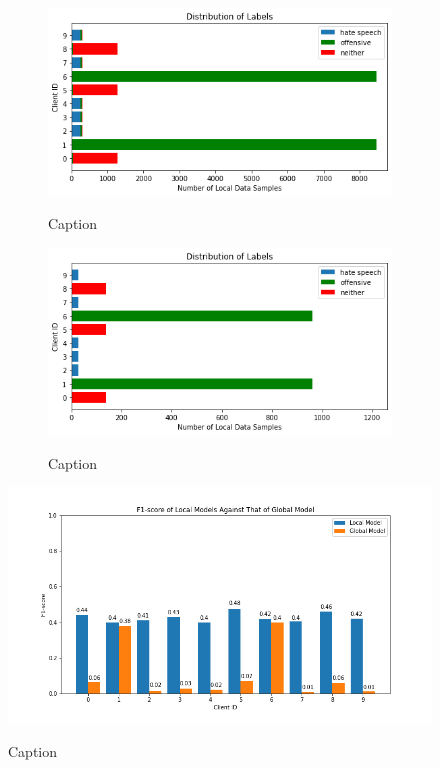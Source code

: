 \documentclass[letterpaper]{article} %
\begin{document}
\begin{figure}[hbt!]

\begin{subfigure}{\columnwidth}
{\includegraphics[width=\columnwidth]{noniid-quantity-based-label-imbalance-1_distribution_of_labels_5}}
\caption{Caption}
\end{subfigure}

\begin{subfigure}{\columnwidth}
{\includegraphics[width=\columnwidth]{noniid-quantity-based-label-imbalance-1_test_set_distribution_of_labels_5}}
\caption{Caption}
\end{subfigure}

\caption{}
\end{figure}

\begin{figure}[hbt!]
{\includegraphics[width=\columnwidth]{noniid-quantity-based-label-imbalance-1_seed_5performance_of_models_on_client_data_f1score}}
\caption{Caption}
\end{figure}
\end{document}
